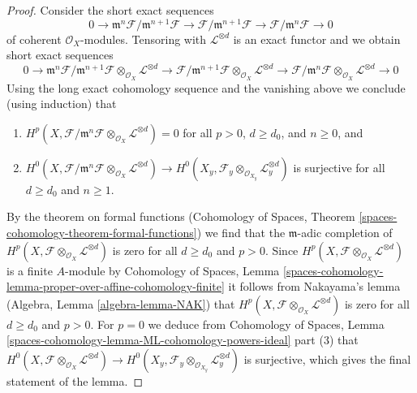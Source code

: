 \documentclass[10pt,a4paper]{amsart}
\theoremstyle{plain}
\theoremstyle{definition}
\theoremstyle{remark}
\numberwithin{equation}{subsection}
\begin{document}
\begin{proof}
\medskip\noindent
Consider the short exact sequences
$$
0 \to \mathfrak m^n\mathcal{F}/\mathfrak m^{n + 1} \mathcal{F}
\to \mathcal{F}/\mathfrak m^{n + 1} \mathcal{F}
\to \mathcal{F}/\mathfrak m^n \mathcal{F} \to 0
$$
of coherent $\mathcal{O}_X$-modules. Tensoring with $\mathcal{L}^{\otimes d}$
is an exact functor and we obtain short exact sequences
$$
0 \to
\mathfrak m^n\mathcal{F}/\mathfrak m^{n + 1} \mathcal{F}
\otimes_{\mathcal{O}_X} \mathcal{L}^{\otimes d}
\to \mathcal{F}/\mathfrak m^{n + 1} \mathcal{F}
\otimes_{\mathcal{O}_X} \mathcal{L}^{\otimes d}
\to \mathcal{F}/\mathfrak m^n \mathcal{F}
\otimes_{\mathcal{O}_X} \mathcal{L}^{\otimes d} \to 0
$$
Using the long exact cohomology sequence and the vanishing above
we conclude (using induction) that
\begin{enumerate}
\item $H^p(X, \mathcal{F}/\mathfrak m^n \mathcal{F}
\otimes_{\mathcal{O}_X} \mathcal{L}^{\otimes d}) = 0$
for all $p > 0$, $d \geq d_0$, and $n \geq 0$, and
\item $H^0(X, \mathcal{F}/\mathfrak m^n \mathcal{F}
\otimes_{\mathcal{O}_X} \mathcal{L}^{\otimes d}) \to
H^0(X_y, \mathcal{F}_y \otimes_{\mathcal{O}_{X_y}} \mathcal{L}_y^{\otimes d})$
is surjective for all $d \geq d_0$ and $n \geq 1$.
\end{enumerate}
By the theorem on formal functions
(Cohomology of Spaces, Theorem
\ref{spaces-cohomology-theorem-formal-functions})
we find that the $\mathfrak m$-adic completion of
$H^p(X, \mathcal{F} \otimes_{\mathcal{O}_X} \mathcal{L}^{\otimes d})$
is zero for all $d \geq d_0$ and $p > 0$.
Since $H^p(X, \mathcal{F} \otimes_{\mathcal{O}_X} \mathcal{L}^{\otimes d})$
is a finite $A$-module by
Cohomology of Spaces, Lemma
\ref{spaces-cohomology-lemma-proper-over-affine-cohomology-finite}
it follows from Nakayama's lemma (Algebra, Lemma \ref{algebra-lemma-NAK})
that $H^p(X, \mathcal{F} \otimes_{\mathcal{O}_X} \mathcal{L}^{\otimes d})$
is zero for all $d \geq d_0$ and $p > 0$.
For $p = 0$ we deduce from
Cohomology of Spaces, Lemma
\ref{spaces-cohomology-lemma-ML-cohomology-powers-ideal} part (3)
that $H^0(X, \mathcal{F} \otimes_{\mathcal{O}_X} \mathcal{L}^{\otimes d}) \to
H^0(X_y, \mathcal{F}_y \otimes_{\mathcal{O}_{X_y}} \mathcal{L}_y^{\otimes d})$
is surjective, which gives the final statement of the lemma.
\end{proof}



\end{document}
